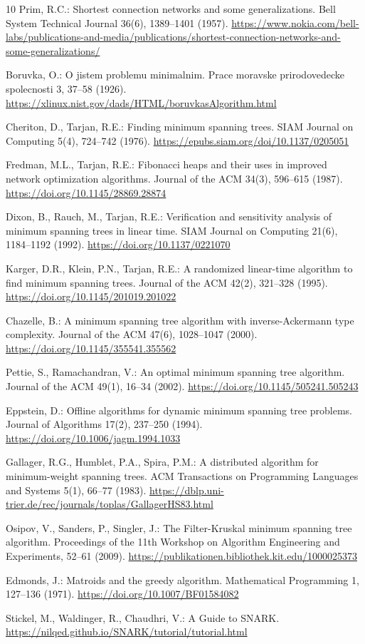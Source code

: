 \documentclass[runningheads]{llncs}
\begin{document}
\begin{thebibliography}{10}
Prim, R.C.:
Shortest connection networks and some generalizations.
Bell System Technical Journal 36(6), 1389--1401 (1957).
\url{https://www.nokia.com/bell-labs/publications-and-media/publications/shortest-connection-networks-and-some-generalizations/}

Boruvka, O.:
O jistem problemu minimalnim.
Prace moravske prirodovedecke spolecnosti 3, 37--58 (1926).
\url{https://xlinux.nist.gov/dads/HTML/boruvkasAlgorithm.html}

Cheriton, D., Tarjan, R.E.:
Finding minimum spanning trees.
SIAM Journal on Computing 5(4), 724--742 (1976).
\url{https://epubs.siam.org/doi/10.1137/0205051}

Fredman, M.L., Tarjan, R.E.:
Fibonacci heaps and their uses in improved network optimization algorithms.
Journal of the ACM 34(3), 596--615 (1987).
\url{https://doi.org/10.1145/28869.28874}

Dixon, B., Rauch, M., Tarjan, R.E.:
Verification and sensitivity analysis of minimum spanning trees in linear time.
SIAM Journal on Computing 21(6), 1184--1192 (1992).
\url{https://doi.org/10.1137/0221070}

Karger, D.R., Klein, P.N., Tarjan, R.E.:
A randomized linear-time algorithm to find minimum spanning trees.
Journal of the ACM 42(2), 321--328 (1995).
\url{https://doi.org/10.1145/201019.201022}

Chazelle, B.:
A minimum spanning tree algorithm with inverse-Ackermann type complexity.
Journal of the ACM 47(6), 1028--1047 (2000).
\url{https://doi.org/10.1145/355541.355562}

Pettie, S., Ramachandran, V.:
An optimal minimum spanning tree algorithm.
Journal of the ACM 49(1), 16--34 (2002).
\url{https://doi.org/10.1145/505241.505243}

Eppstein, D.:
Offline algorithms for dynamic minimum spanning tree problems.
Journal of Algorithms 17(2), 237--250 (1994).
\url{https://doi.org/10.1006/jagm.1994.1033}

Gallager, R.G., Humblet, P.A., Spira, P.M.:
A distributed algorithm for minimum-weight spanning trees.
ACM Transactions on Programming Languages and Systems 5(1), 66--77 (1983).
\url{https://dblp.uni-trier.de/rec/journals/toplas/GallagerHS83.html}

Osipov, V., Sanders, P., Singler, J.:
The Filter-Kruskal minimum spanning tree algorithm.
Proceedings of the 11th Workshop on Algorithm Engineering and Experiments,
52--61 (2009).
\url{https://publikationen.bibliothek.kit.edu/1000025373}

Edmonds, J.:
Matroids and the greedy algorithm.
Mathematical Programming 1, 127--136 (1971).
\url{https://doi.org/10.1007/BF01584082}

Stickel, M., Waldinger, R., Chaudhri, V.:
A Guide to SNARK.
\url{https://nilqed.github.io/SNARK/tutorial/tutorial.html}

\end{thebibliography}
\end{document}
